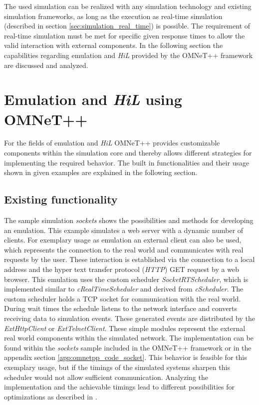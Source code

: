 The used simulation can be realized with any simulation technology and existing simulation frameworks, as long as the execution as real-time simulation (described in section \ref{sec:simulation_real_time}) is possible.
The requirement of real-time simulation must be met for specific given response times to allow the valid interaction with external components.
In the following section the capabilities regarding emulation and \emph{HiL} provided by the OMNeT++ framework are discussed and analyzed.

\section{Emulation and \emph{HiL} using OMNeT++}
\label{sec:emulation_omnet}
For the fields of emulation and \emph{HiL} OMNeT++ provides customizable components within the simulation core and thereby allows different strategies for implementing the required behavior.
The built in functionalities and their usage shown in given examples are explained in the following section.

\subsection{Existing functionality}
\label{sec:emulation_omnet_existing}

The sample simulation \emph{sockets} shows the possibilities and methods for developing an emulation.
This example simulates a web server with a dynamic number of clients.
For exemplary usage as emulation an external client can also be used, which represents the connection to the real world and communicates with real requests by the user.
These interaction is established via the connection to a local address and the hyper text transfer protocol (\emph{HTTP}) GET request by a web browser.
This emulation uses the custom scheduler \emph{SocketRTScheduler}, which is implemented similar to \emph{cRealTimeScheduler} and derived from \emph{cScheduler}. \cite{omnet_api}
The custom scheduler holds a TCP socket for communication with the real world.
During wait times the schedule listens to the network interface and converts receiving data to simulation events.
These generated events are distributed by the \emph{ExtHttpClient} or \emph{ExtTelnetClient}.
These simple modules represent the external real world components within the simulated network.
The implementation can be found within the \emph{sockets} sample included in the OMNeT++ framework or in the appendix section \ref{app:omnetpp_code_socket}.
This behavior is feasible for this exemplary usage, but if the timings of the simulated systems sharpen this scheduler would not allow sufficient communication.
Analyzing the implementation and the achievable timings lead to different possibilities for optimizations as described in \cite{scussel_improvements_2015}.

